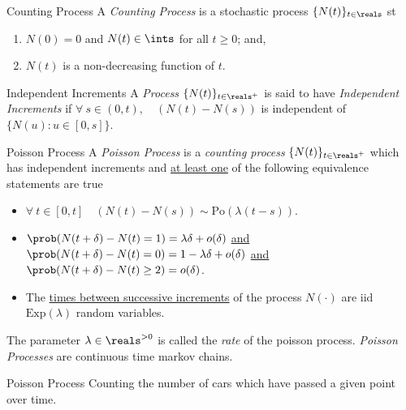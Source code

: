 \documentclass[11pt,a4paper]{article}
\begin{document}
\begin{definition}{Counting Process}
  A \textit{Counting Process} is a stochastic process $\{N(t)\}_{t\in\reals}$ st
  \begin{enumerate}
    \item $N(0)=0$ and $N(t)\in\ints$ for all $t\geq0$; and,
    \item $N(t)$ is a non-decreasing function of $t$.
  \end{enumerate}
\end{definition}

\begin{definition}{Independent Increments}
  A \textit{Process} $\{N(t)\}_{t\in\reals^+}$ is said to have \textit{Independent Increments} if $\forall\ s\in(0,t),\quad(N(t)-N(s))$ is independent of $\{N(u):u\in[0,s]\}$.
\end{definition}


\begin{definition}{Poisson Process}
  A \textit{Poisson Process} is a \textit{counting process} $\{N(t)\}_{t\in\reals^+}$ which has independent increments and \underline{at least one} of the following equivalence statements are true
  \begin{itemize}
    \item $\forall\ t\in[0,t]\quad(N(t)-N(s))\sim\text{Po}(\lambda(t-s))$.
    \item $\prob(N(t+\delta)-N(t)=1)=\lambda\delta+o(\delta)$ \underline{and}\\
    $\prob(N(t+\delta)-N(t)=0)=1-\lambda\delta+o(\delta)$ \underline{and}\\
    $\prob(N(t+\delta)-N(t)\geq2)=o(\delta)$.
    \item The \underline{times between successive increments} of the process $N(\cdot)$ are iid $\text{Exp}(\lambda)$ random variables.
  \end{itemize}
  The parameter $\lambda\in\reals^{>0}$ is called the \textit{rate} of the poisson process. \textit{Poisson Processes} are continuous time markov chains.
\end{definition}

\begin{example}{Poisson Process}
  Counting the number of cars which have passed a given point over time.
\end{example}
\end{document}
